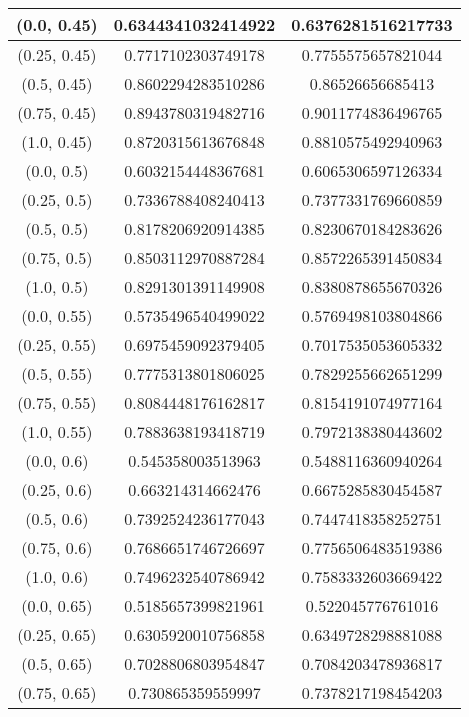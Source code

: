 \begin{table}[H]
\begin{tabular}{|c|c|c|}
\hline
(0.0, 0.45) & 0.6344341032414922 & 0.6376281516217733 \\
\hline
(0.25, 0.45) & 0.7717102303749178 & 0.7755575657821044 \\
\hline
(0.5, 0.45) & 0.8602294283510286 & 0.86526656685413 \\
\hline
(0.75, 0.45) & 0.8943780319482716 & 0.9011774836496765 \\
\hline
(1.0, 0.45) & 0.8720315613676848 & 0.8810575492940963 \\
\hline
\hline
(0.0, 0.5) & 0.6032154448367681 & 0.6065306597126334 \\
\hline
(0.25, 0.5) & 0.7336788408240413 & 0.7377331769660859 \\
\hline
(0.5, 0.5) & 0.8178206920914385 & 0.8230670184283626 \\
\hline
(0.75, 0.5) & 0.8503112970887284 & 0.8572265391450834 \\
\hline
(1.0, 0.5) & 0.8291301391149908 & 0.8380878655670326 \\
\hline
\hline
(0.0, 0.55) & 0.5735496540499022 & 0.5769498103804866 \\
\hline
(0.25, 0.55) & 0.6975459092379405 & 0.7017535053605332 \\
\hline
(0.5, 0.55) & 0.7775313801806025 & 0.7829255662651299 \\
\hline
(0.75, 0.55) & 0.8084448176162817 & 0.8154191074977164 \\
\hline
(1.0, 0.55) & 0.7883638193418719 & 0.7972138380443602 \\
\hline
\hline
(0.0, 0.6) & 0.545358003513963 & 0.5488116360940264 \\
\hline
(0.25, 0.6) & 0.663214314662476 & 0.6675285830454587 \\
\hline
(0.5, 0.6) & 0.7392524236177043 & 0.7447418358252751 \\
\hline
(0.75, 0.6) & 0.7686651746726697 & 0.7756506483519386 \\
\hline
(1.0, 0.6) & 0.7496232540786942 & 0.7583332603669422 \\
\hline
\hline
(0.0, 0.65) & 0.5185657399821961 & 0.522045776761016 \\
\hline
(0.25, 0.65) & 0.6305920010756858 & 0.6349728298881088 \\
\hline
(0.5, 0.65) & 0.7028806803954847 & 0.7084203478936817 \\
\hline
(0.75, 0.65) & 0.730865359559997 & 0.7378217198454203 \\

\end{tabular}
\end{table}
